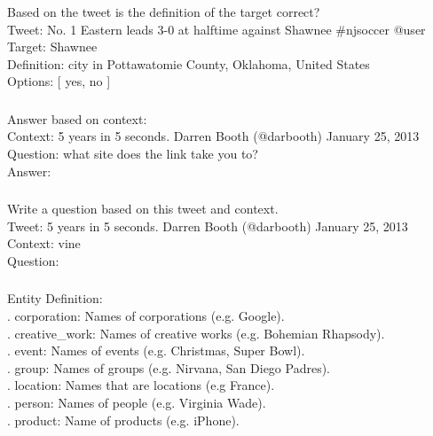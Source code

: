 \subsubsection*{{\TweetNERD}}
Based on the tweet is the definition of the target correct? \\
\noindent Tweet: No. 1 Eastern leads 3-0 at halftime against Shawnee \#njsoccer @user \\
\noindent Target: Shawnee \\
\noindent Definition: city in Pottawatomie County, Oklahoma, United States \\
\noindent Options: [ yes, no ]

\subsubsection*{{\TweetQA}}
Answer based on context: \\
\noindent Context: 5 years in 5 seconds. Darren Booth (@darbooth) January 25, 2013 \\
\noindent Question: what site does the link take you to? \\
\noindent Answer:

\subsubsection*{{\TweetQG}}
Write a question based on this tweet and context. \\
\noindent Tweet: 5 years in 5 seconds. Darren Booth (@darbooth) January 25, 2013 \\
\noindent Context: vine \\
\noindent Question: \\

\subsubsection*{{\TweetNER}}
\label{sec:ner_prompt}
Entity Definition: \\
. corporation: Names of corporations (e.g. Google). \\
. creative\_work: Names of creative works (e.g. Bohemian Rhapsody). \\
. event: Names of events (e.g. Christmas, Super Bowl). \\
. group: Names of groups (e.g. Nirvana, San Diego Padres). \\
. location: Names that are locations (e.g France). \\
. person: Names of people (e.g. Virginia Wade). \\
. product: Name of products (e.g. iPhone). \\

